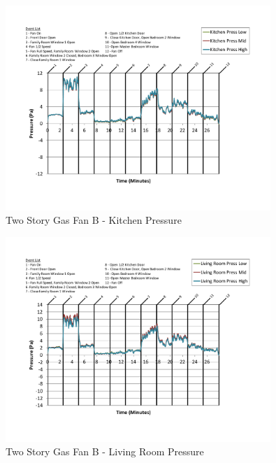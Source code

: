 \documentclass{article}
\begin{document}
\begin{appendices}
	\begin{figure}[H]
		\centering
		\includegraphics[height=3.05in,trim=0.67in 1.1in 0.67in 0.8in,clip=true]{0_Images/Results_Charts/ColdFlow/Two_Story/Gas/B/Kitchen_Pressure.pdf}
		\caption{Two Story Gas Fan B - Kitchen Pressure}
	\end{figure}
 

	\begin{figure}[H]
		\centering
		\includegraphics[height=3.05in,trim=0.67in 1.1in 0.67in 0.8in,clip=true]{0_Images/Results_Charts/ColdFlow/Two_Story/Gas/B/Living_Room_Pressure.pdf}
		\caption{Two Story Gas Fan B - Living Room Pressure}
	\end{figure}
 
	\clearpage


\end{appendices}
\end{document}

